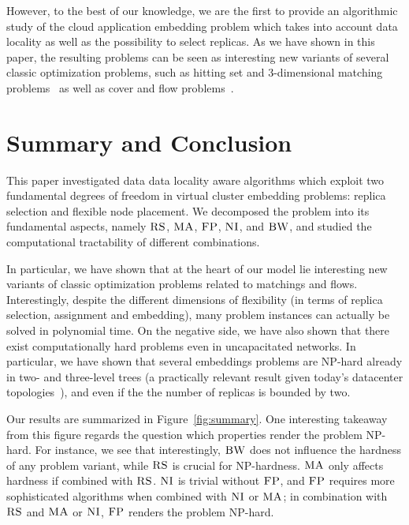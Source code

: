 \documentclass[9pt,twocolumn]{scrartcl}
\newcommand{\CC}{\textsc{NI}}
\newcommand{\FP}{\textsc{FP}}
\newcommand{\RS}{\textsc{RS}}
\newcommand{\BW}{\textsc{BW}}
\newcommand{\MA}{\textsc{MA}}
\begin{document}
However, to the best of our knowledge, we are the first to provide an algorithmic
study of the cloud application embedding problem which takes into account
data locality as well as the possibility to select replicas. As we have shown in this paper,
the resulting problems can be seen as interesting new variants of several classic optimization
problems, such as hitting set and 3-dimensional matching problems~\cite{3SC-hard} as well as cover and flow problems~\cite{korte2002combinatorial}.

\section{Summary and Conclusion}\label{sec:conclusion}

This paper investigated data data locality aware algorithms which exploit two fundamental
degrees of freedom in virtual cluster
embedding problems: replica selection and flexible node placement. We
decomposed the problem into its fundamental aspects,
namely $\RS$, $\MA$, $\FP$, $\CC$, and $\BW$, and studied the computational
tractability of different combinations.

In particular, we have shown that
at the heart of our model lie interesting new variants of classic
optimization problems related to matchings and flows. Interestingly, despite the
different dimensions of flexibility (in terms of replica selection, assignment and embedding),
many problem instances can actually be solved in polynomial time.
On the negative side, we have also shown that there exist computationally hard
problems even in uncapacitated networks. In particular,
we have shown that several embeddings problems are NP-hard already in two- and three-level trees
(a practically relevant result given today's datacenter topologies~\cite{fattree}),
and even if the the number of replicas is bounded by two.


Our results are summarized in
Figure~\ref{fig:summary}.
One interesting takeaway from this figure regards
the question which properties render the problem
NP-hard. For instance, we see that interestingly, $\BW$
does not influence the hardness of any problem variant,
while $\RS$ is crucial for NP-hardness.
$\MA$ only affects hardness if combined with $\RS$.
$\CC$ is trivial without $\FP$, and $\FP$ requires
more sophisticated algorithms when combined with $\CC$ or $\MA$;
in combination with $\RS$ and $\MA$ or $\CC$, $\FP$ renders the
problem NP-hard.
\end{document}
